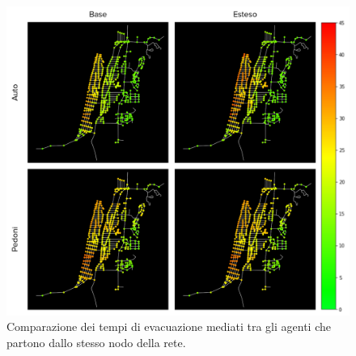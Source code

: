 \begin{figure}[ht]
    \centering
    \includegraphics[width=\textwidth]{images/analisi/comparison-evtimes-map.png}
    \caption{Comparazione dei tempi di evacuazione mediati tra gli agenti che partono dallo stesso nodo della rete. }
    \label{fig:analisi-comparison-ev-times-map}
\end{figure}

\pagebreak





